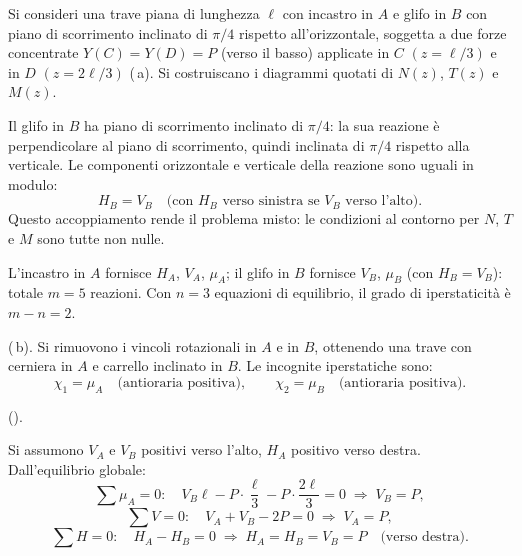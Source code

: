 \begin{esempio}
	Si consideri una trave piana di lunghezza $\ell$
	con incastro in $A$ e glifo in $B$ con piano di
	scorrimento inclinato di $\pi/4$ rispetto
	all'orizzontale, soggetta a due forze concentrate
	$Y(C) = Y(D) = P$ (verso il basso) applicate in
	$C$ $(z = \ell/3)$ e in $D$ $(z = 2\ell/3)$
	(\,a).
	Si costruiscano i diagrammi quotati di $N(z)$, $T(z)$
	e $M(z)$.
	
	\begin{svolgimento}
		
		




		
		Il glifo in $B$ ha piano di scorrimento
		inclinato di $\pi/4$: la sua reazione è
		perpendicolare al piano di scorrimento,
		quindi inclinata di $\pi/4$ rispetto alla
		verticale. Le componenti orizzontale e
		verticale della reazione sono uguali in
		modulo:
		\[
		H_B = V_B
		\quad\text{(con $H_B$ verso sinistra
			se $V_B$ verso l'alto)}.
		\]
		Questo accoppiamento rende il problema misto:
		le condizioni al contorno per $N$, $T$ e $M$ sono tutte non nulle.
		
		L'incastro in $A$ fornisce $H_A$, $V_A$,
		$\mu_A$; il glifo in $B$ fornisce $V_B$,
		$\mu_B$ (con $H_B = V_B$): totale $m = 5$
		reazioni. Con $n = 3$ equazioni di equilibrio,
		il grado di iperstaticità è $m - n = 2$.
		
		(\,b).
		Si rimuovono i vincoli rotazionali in $A$ e
		in $B$, ottenendo una trave con cerniera in
		$A$ e carrello inclinato in $B$. Le incognite
		iperstatiche sono:
		\[
		\chi_1 = \mu_A \quad\text{(antioraria
			positiva)}, \qquad
		\chi_2 = \mu_B \quad\text{(antioraria
			positiva)}.
		\]
		
		().
		



		

		
		Si assumono $V_A$ e $V_B$ positivi verso
		l'alto, $H_A$ positivo verso destra.
		Dall'equilibrio globale:
		\[
		\sum \mu_A = 0:\quad
		V_B\ell - P\cdot\frac{\ell}{3}
		- P\cdot\frac{2\ell}{3} = 0
		\;\Rightarrow\; V_B = P,
		\]
		\[
		\sum V = 0:\quad
		V_A + V_B - 2P = 0
		\;\Rightarrow\; V_A = P,
		\]
		\[
		\sum H = 0:\quad
		H_A - H_B = 0
		\;\Rightarrow\; H_A = H_B = V_B = P
		\quad\text{(verso destra)}.
		\]
		

\end{svolgimento}
\end{esempio}
